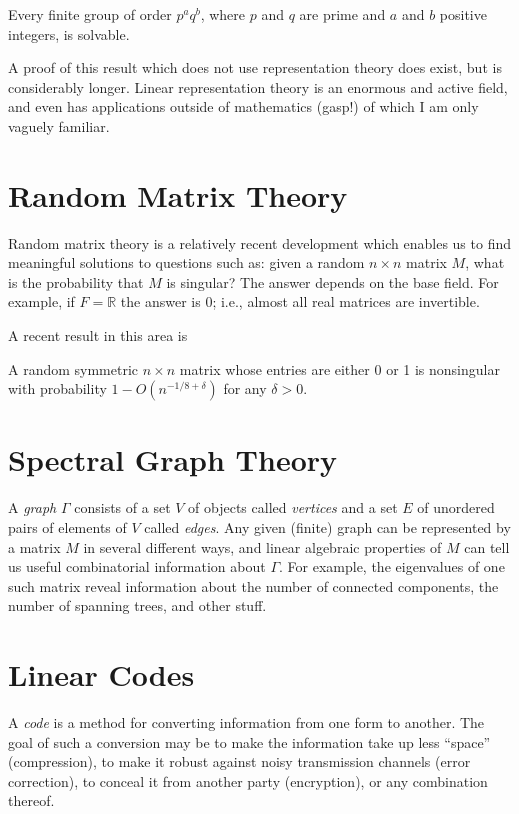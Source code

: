 \documentclass{memoir}
\begin{document}
\begin{prp}
Every finite group of order $p^a q^b$, where $p$ and $q$ are prime and $a$ and $b$ positive integers, is solvable.
\end{prp}

A proof of this result which does not use representation theory does exist, but is considerably longer. Linear representation theory is an enormous and active field, and even has applications outside of mathematics (gasp!) of which I am only vaguely familiar.

\section{Random Matrix Theory}

Random matrix theory is a relatively recent development which enables us to find meaningful solutions to questions such as: given a random $n \times n$ matrix $M$, what is the probability that $M$ is singular? The answer depends on the base field. For example, if $F = \mathbb{R}$ the answer is 0; i.e., almost all real matrices are invertible.

A recent result in this area is 

\begin{prp}
A random symmetric $n \times n$ matrix whose entries are either 0 or 1 is nonsingular with probability $1 - O(n^{-1/8 + \delta})$ for any $\delta > 0$.
\end{prp}

\section{Spectral Graph Theory}

A \emph{graph} $\Gamma$ consists of a set $V$ of objects called \emph{vertices} and a set $E$ of unordered pairs of elements of $V$ called \emph{edges}. Any given (finite) graph can be represented by a matrix $M$ in several different ways, and linear algebraic properties of $M$ can tell us useful combinatorial information about $\Gamma$. For example, the eigenvalues of one such matrix reveal information about the number of connected components, the number of spanning trees, and other stuff.

\section{Linear Codes}

A \emph{code} is a method for converting information from one form to another. The goal of such a conversion may be to make the information take up less ``space'' (compression), to make it robust against noisy transmission channels (error correction), to conceal it from another party (encryption), or any combination thereof.
\end{document}
